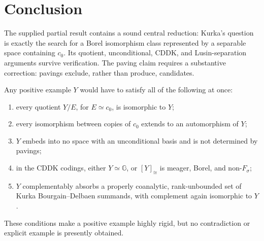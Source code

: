 \documentclass[11pt]{article}
\theoremstyle{definition}
\newcommand{\czer}{c_0}
\newcommand{\G}{\mathbb G}
\newcommand{\iso}{\simeq}
\newcommand{\class}[1]{[#1]_{\cong}}
\begin{document}
\section{Conclusion}

The supplied partial result contains a sound central reduction: Kurka's
question is exactly the search for a Borel isomorphism class represented by a
separable space containing \(\czer\).  Its quotient, unconditional, CDDK, and
Lusin-separation arguments survive verification.  The paving claim requires a
substantive correction: pavings exclude, rather than produce, candidates.

Any positive example \(Y\) would have to satisfy all of the following at once:
\begin{enumerate}[label=(\arabic*)]
\item every quotient \(Y/E\), for \(E\iso\czer\), is isomorphic to \(Y\);
\item every isomorphism between copies of \(\czer\) extends to an automorphism
      of \(Y\);
\item \(Y\) embeds into no space with an unconditional basis and is not
      determined by pavings;
\item in the CDDK codings, either \(Y\iso\G\), or \(\class{Y}\) is meager,
      Borel, and non-\(F_\sigma\);
\item \(Y\) complementably absorbs a properly coanalytic, rank-unbounded set
      of Kurka Bourgain--Delbaen summands, with complement again isomorphic to
      \(Y\).
\end{enumerate}
These conditions make a positive example highly rigid, but no contradiction
or explicit example is presently obtained.
\end{document}
